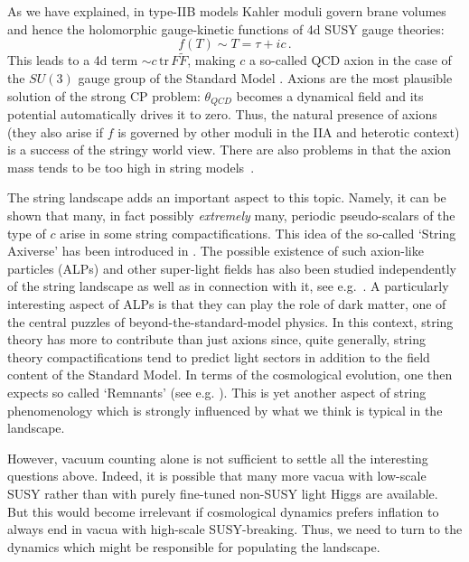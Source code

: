 \documentclass[12pt]{article}
\newcommand{\be}{\begin{equation}}
\newcommand{\ee}{\end{equation}}
\numberwithin{equation}{section}
\begin{document}
As we have explained, in type-IIB models Kahler moduli govern brane volumes and hence the holomorphic gauge-kinetic functions of 4d SUSY gauge theories:
\be
f(T)\sim T =\tau+ic\,.
\ee
This leads to a 4d term $\sim c\,\mbox{tr}\,F\tilde{F}$, making $c$ a so-called QCD axion in the case of the $SU(3)$ gauge group of the Standard Model \cite{Weinberg:1995mt, Ringwald}. Axions are the most plausible solution of the strong CP problem:
$\theta_{QCD}$ becomes a dynamical field and its potential automatically drives it to zero. Thus, the natural presence of axions (they also arise if $f$ is governed by other moduli in the IIA and heterotic context) is a success of the stringy world view. There are also problems in that the axion mass tends to be too high in string models~\cite{Conlon:2006tq, Svrcek:2006yi}. 

The string landscape adds an important aspect to this topic. Namely, it can be shown that many, in fact possibly {\it extremely} many, periodic pseudo-scalars of the type of $c$ arise in some string compactifications. This idea of the so-called `String Axiverse' has been introduced in \cite{Arvanitaki:2009fg}. The possible existence of such axion-like particles (ALPs) and other super-light fields has also been studied independently of the string landscape as well as in connection with it, see e.g.~\cite{Jaeckel:2010ni, Cicoli:2012sz}. A particularly interesting aspect of ALPs is that they can play the role of dark matter, one of the central puzzles of beyond-the-standard-model physics. In this context, string theory has more to contribute than just axions since, quite generally, string theory compactifications tend to predict light sectors in addition to the field content of the Standard Model. In terms of the cosmological evolution, one then expects so called `Remnants' (see e.g. \cite{Halverson:2018vbo}). This is yet another aspect of string phenomenology which is strongly influenced by what we think is typical in the landscape.

However, vacuum counting alone is not sufficient to settle all the interesting questions above. Indeed, it is possible that many more vacua with low-scale SUSY rather than with purely fine-tuned non-SUSY light Higgs are available. But this would become irrelevant if cosmological dynamics prefers inflation to always end in vacua with high-scale SUSY-breaking. Thus, we need to turn to the dynamics which might be responsible for populating the landscape.
\end{document}
